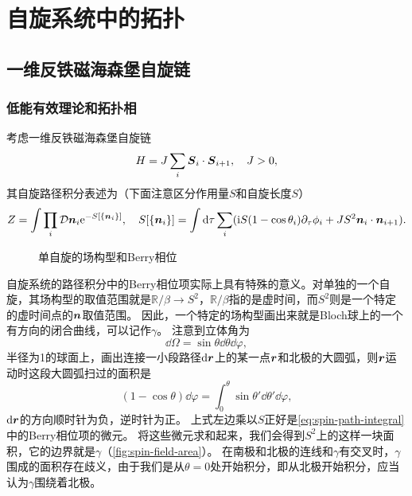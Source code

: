 \chapter{自旋系统中的拓扑}

\section{一维反铁磁海森堡自旋链}

\subsection{低能有效理论和拓扑相}



考虑一维反铁磁海森堡自旋链
\begin{equation}
    H = J \sum_{i} \vb*{S}_i \cdot \vb*{S}_{i+1}, \quad J > 0,
\end{equation}
其自旋路径积分表述为（下面注意区分作用量$S$和自旋长度$S$）
\begin{equation}
    Z = \int \prod_i \mathcal{D} \vb*{n}_i \mathrm{e}^{-S[\{\vb*{n}_i\}]} , \quad S[\{\vb*{n}_i\}] = \int \dd{\tau} \sum_i ( \mathrm{i} S (1 - \cos \theta_i) \partial_\tau \phi_i + J S^2 \vb*{n}_i \cdot \vb*{n}_{i+1} ).
\end{equation}

\begin{figure}
    \centering
    \caption{单自旋的场构型和Berry相位}
\end{figure}

自旋系统的路径积分中的Berry相位项实际上具有特殊的意义。对单独的一个自旋，其场构型的取值范围就是$\mathbb{R} / \beta \rightarrow S^2$，$\mathbb{R} / \beta$指的是虚时间，而$S^2$则是一个特定的虚时间点的$\vb*{n}$取值范围。
因此，一个特定的场构型画出来就是Bloch球上的一个有方向的闭合曲线，可以记作$\gamma$。
注意到立体角为
\[
    \dd{\Omega} = \sin \theta \dd{\theta} \dd{\varphi},
\]
半径为1的球面上，画出连接一小段路径$\dd{\vb*{r}}$上的某一点$\vb*{r}$和北极的大圆弧，则$\vb*{r}$运动时这段大圆弧扫过的面积是
\[
    (1 - \cos \theta) \dd{\varphi} = \int_0^\theta \sin \theta' \dd{\theta'} \dd{\varphi},
\]
$\dd{\vb*{r}}$的方向顺时针为负，逆时针为正。
上式左边乘以$S$正好是\eqref{eq:spin-path-integral}中的Berry相位项的微元。
将这些微元求和起来，我们会得到$S^2$上的这样一块面积，它的边界就是$\gamma$（\autoref{fig:spin-field-area}）。
在南极和北极的连线和$\gamma$有交叉时，$\gamma$围成的面积存在歧义，由于我们是从$\theta=0$处开始积分，即从北极开始积分，应当认为$\gamma$围绕着北极。

